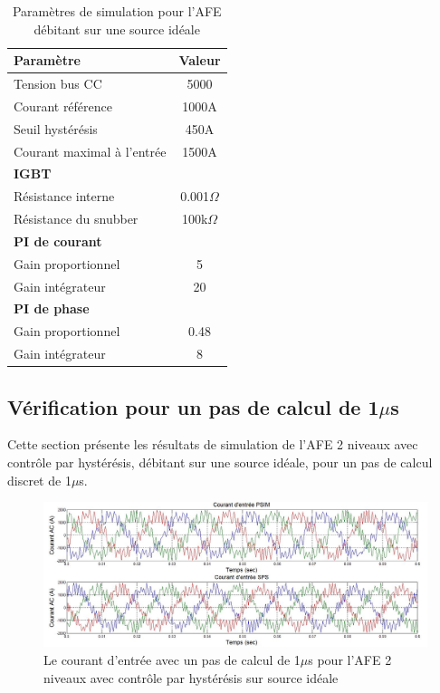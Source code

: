 \begin{table}[htb]
\centering
\begin{tabular}{|l|c|} 
  \hline
  \textbf{Paramètre} & \textbf{Valeur}  \\
  \hline\hline
  Tension bus CC & 5000\\ \hline
  Courant référence & 1000A\\ \hline
  Seuil hystérésis & 450A\\ \hline
  Courant maximal à l'entrée& 1500A \\ \hline \hline
  \multicolumn{2}{|l|}{\textbf{IGBT}}\\ \hline
  Résistance interne & 0.001$\Omega$\\
  Résistance du snubber & 100k$\Omega$\\ \hline \hline
   \multicolumn{2}{|l|}{\textbf{PI de courant}}\\ \hline
  Gain proportionnel & 5 \\
  Gain intégrateur & 20 \\ \hline \hline
  \multicolumn{2}{|l|}{\textbf{PI de phase}}\\ \hline
  Gain proportionnel & 0.48 \\
  Gain intégrateur & 8 \\ \hline \hline
  \hline
\end{tabular}
\caption{Paramètres de simulation pour l'AFE débitant sur une source idéale}
\label{p_AF_ID}
\end{table}
\clearpage

\subsection{Vérification pour un pas de calcul de 1$\mu$s}
Cette section présente les résultats de simulation de l'AFE 2 niveaux avec contrôle par hystérésis, débitant sur une source idéale, pour un pas de calcul discret de 1$\mu$s. 


\begin{figure}[htb]
\centering
\includegraphics[scale=0.5]{fig/AFEIDEAL/CourantAC.jpg}
\caption{Le courant d'entrée avec un pas de calcul de 1$\mu$s pour l'AFE 2 niveaux avec contrôle par hystérésis sur source idéale}
\label{AF_I_cou}
\end{figure}




